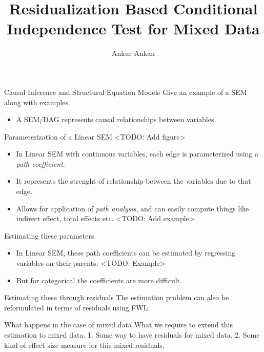 \documentclass{beamer}
\begin{document}
\title[]{Residualization Based Conditional Independence Test for Mixed Data}
\author{Ankur Ankan}
\date{}

\maketitle

\begin{frame}{Causal Inference and Structural Equation Models}
	Give an example of a SEM along with examples.
	\begin{itemize}
		\item A SEM/DAG represents causal relationships between variables.
	\end{itemize}
\end{frame}

\begin{frame}{Parameterization of a Linear SEM}
	<TODO: Add figure>
	\begin{itemize}
		\item In Linear SEM with continuous variables, each edge is parameterized
			using a \emph{path coefficient}.
		\item It represents the strenght of relationship between the variables
			due to that edge.
		\item Allows for application of \emph{path analysis}, and can easily
			compute things like indirect effect, total effects etc.
			<TODO: Add example>
	\end{itemize}
\end{frame}

\begin{frame}{Estimating these parameters}
	\begin{itemize}
		\item In Linear SEM, these path coefficients can be estimated by regressing
			variables on their parents. <TODO: Example>
		\item But for categorical the coefficients are more difficult.
	\end{itemize}
\end{frame}

\begin{frame}{Estimating these through residuals}
	The estimation problem can also be reformulated in terms of residuals using FWL.
\end{frame}

\begin{frame}{What happens in the case of mixed data}
	What we require to extend this estimation to mixed data.
	1. Some way to have residuals for mixed data.
	2. Some kind of effect size measure for this mixed residuals.
\end{frame}
\end{document}
